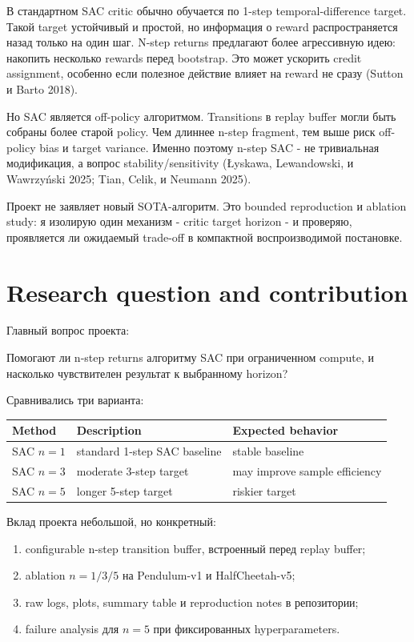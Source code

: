 \documentclass[
  russian,
]{article}
\providecommand{\tightlist}{%
  \setlength{\itemsep}{0pt}\setlength{\parskip}{0pt}}
\begin{document}
В стандартном SAC critic обычно обучается по 1-step temporal-difference
target. Такой target устойчивый и простой, но информация о reward
распространяется назад только на один шаг. N-step returns предлагают
более агрессивную идею: накопить несколько rewards перед bootstrap. Это
может ускорить credit assignment, особенно если полезное действие влияет
на reward не сразу (Sutton и Barto 2018).

Но SAC является off-policy алгоритмом. Transitions в replay buffer могли
быть собраны более старой policy. Чем длиннее n-step fragment, тем выше
риск off-policy bias и target variance. Именно поэтому n-step SAC - не
тривиальная модификация, а вопрос stability/sensitivity (Łyskawa,
Lewandowski, и Wawrzyński 2025; Tian, Celik, и Neumann 2025).

Проект не заявляет новый SOTA-алгоритм. Это bounded reproduction и
ablation study: я изолирую один механизм - critic target horizon - и
проверяю, проявляется ли ожидаемый trade-off в компактной
воспроизводимой постановке.

\section{Research question and
contribution}\label{research-question-and-contribution}

Главный вопрос проекта:

\begin{keybox}
Помогают ли n-step returns алгоритму SAC при ограниченном compute, и насколько чувствителен результат к выбранному horizon?
\end{keybox}

Сравнивались три варианта:

\begin{longtable}[]{@{}lll@{}}
\toprule\noalign{}
Method & Description & Expected behavior \\
\midrule\noalign{}
\endhead
\bottomrule\noalign{}
\endlastfoot
SAC \(n=1\) & standard 1-step SAC baseline & stable baseline \\
SAC \(n=3\) & moderate 3-step target & may improve sample efficiency \\
SAC \(n=5\) & longer 5-step target & riskier target \\
\end{longtable}

Вклад проекта небольшой, но конкретный:

\begin{enumerate}
\def\labelenumi{\arabic{enumi}.}
\tightlist
\item
  configurable n-step transition buffer, встроенный перед replay buffer;
\item
  ablation \(n=1/3/5\) на Pendulum-v1 и HalfCheetah-v5;
\item
  raw logs, plots, summary table и reproduction notes в репозитории;
\item
  failure analysis для \(n=5\) при фиксированных hyperparameters.
\end{enumerate}
\end{document}

